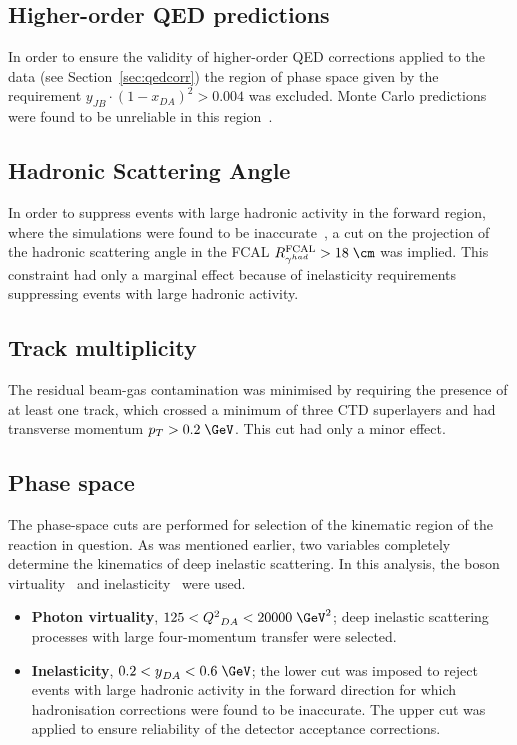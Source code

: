 \subsection{Higher-order QED predictions}
\label{subsec:qedcorcut}
In order to ensure the validity of higher-order QED corrections applied to the data (see Section~\ref{sec:qedcorr}) the region of phase space given by the requirement $y_{JB}\cdot\left(1-x_{DA}\right)^2>0.004$ was excluded. Monte Carlo predictions were found to be unreliable in this region~\cite{cpc:81:381}.

\subsection{Hadronic Scattering Angle}
\label{subsec:gammahadcut}
In order to suppress events with large hadronic activity in the forward region, where the simulations were found to be inaccurate~\cite{thesis:jose:2003}, a cut on the projection of the hadronic scattering angle in the FCAL $R^\text{FCAL}_{\gamma^{had}} > 18\;\cm$ was implied. This constraint had only a marginal effect because of inelasticity requirements suppressing events with large hadronic activity.

\subsection{Track multiplicity}
\label{subsec:trackmultcut}
The residual beam-gas contamination was minimised by requiring the presence of at least one track, which crossed a minimum of three CTD superlayers and had transverse momentum $p_T>0.2\;\GeV$. This cut had only a minor effect.

\subsection{Phase space}
\label{subsec:phasespace}
The phase-space cuts are performed for selection of the kinematic region of the reaction in question. As was mentioned earlier, two variables completely determine the kinematics of deep inelastic scattering. In this analysis, the boson virtuality \qsq~and inelasticity \y~were used.
\begin{itemize}
	\item \textbf{Photon virtuality}, $125 < \qsq_{DA} < 20000\;\GeV^2$;  deep inelastic scattering processes with large four-momentum transfer were selected.
	\item \textbf{Inelasticity}, $0.2 < \y_{DA} < 0.6\;\GeV$; the lower cut was imposed to reject events with large hadronic activity in the forward direction for which hadronisation corrections were found to be inaccurate. The upper cut was applied to ensure reliability of the detector acceptance corrections.
\end{itemize}

